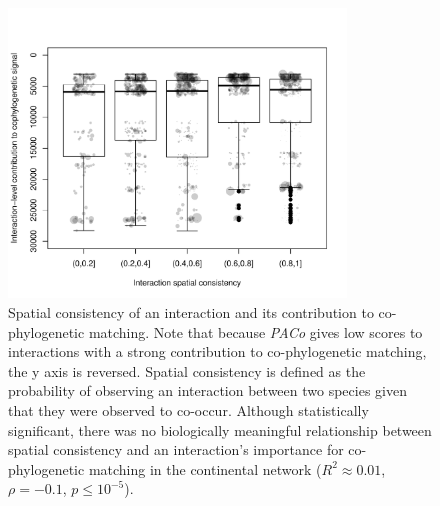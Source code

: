 \documentclass[12pt]{article}
\begin{document}
\begin{figure}[htbp]
\centering
\includegraphics[width=0.80000\textwidth]{figures/figure3.pdf}
\caption{Spatial consistency of an interaction and its contribution to
co-phylogenetic matching. Note that because \emph{PACo} gives low scores
to interactions with a strong contribution to co-phylogenetic matching,
the y axis is reversed. Spatial consistency is defined as the
probability of observing an interaction between two species given that
they were observed to co-occur. Although statistically significant,
there was no biologically meaningful relationship between spatial
consistency and an interaction's importance for co-phylogenetic matching
in the continental network (\(R^2 \approx 0.01\), \(\rho = -0.1\),
\(p \leq 10^{-5}\)).\label{fig:consistency}}
\end{figure}
\end{document}
